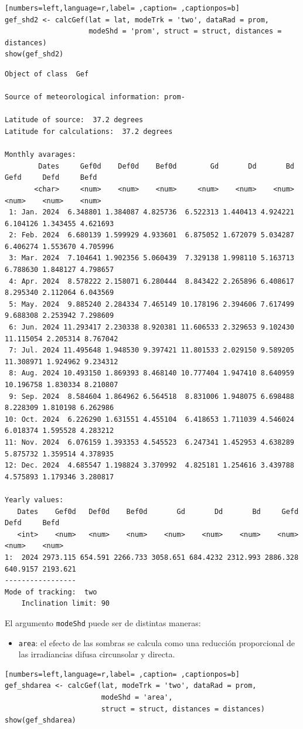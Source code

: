 \begin{lstlisting}[numbers=left,language=r,label= ,caption= ,captionpos=b]
gef_shd2 <- calcGef(lat = lat, modeTrk = 'two', dataRad = prom,
                    modeShd = 'prom', struct = struct, distances = distances)
show(gef_shd2)
\end{lstlisting}

\begin{verbatim}
Object of class  Gef 

Source of meteorological information: prom- 

Latitude of source:  37.2 degrees
Latitude for calculations:  37.2 degrees

Monthly avarages:
        Dates     Gef0d    Def0d    Bef0d        Gd       Dd       Bd      Gefd     Defd     Befd
       <char>     <num>    <num>    <num>     <num>    <num>    <num>     <num>    <num>    <num>
 1: Jan. 2024  6.348801 1.384087 4.825736  6.522313 1.440413 4.924221  6.104126 1.343455 4.621693
 2: Feb. 2024  6.680139 1.599929 4.933601  6.875052 1.672079 5.034287  6.406274 1.553670 4.705996
 3: Mar. 2024  7.104641 1.902356 5.060439  7.329138 1.998110 5.163713  6.788630 1.848127 4.798657
 4: Apr. 2024  8.578222 2.158071 6.280444  8.843422 2.265896 6.408617  8.295340 2.112064 6.043569
 5: May. 2024  9.885240 2.284334 7.465149 10.178196 2.394606 7.617499  9.688308 2.253942 7.298609
 6: Jun. 2024 11.293417 2.230338 8.920381 11.606533 2.329653 9.102430 11.115054 2.205314 8.767042
 7: Jul. 2024 11.495648 1.948530 9.397421 11.801533 2.029150 9.589205 11.308971 1.924962 9.234312
 8: Aug. 2024 10.493150 1.869393 8.468140 10.777404 1.947410 8.640959 10.196758 1.830334 8.210807
 9: Sep. 2024  8.584604 1.864962 6.564518  8.831006 1.948075 6.698488  8.228309 1.810198 6.262986
10: Oct. 2024  6.226290 1.631551 4.455104  6.418653 1.711039 4.546024  6.018374 1.595528 4.283212
11: Nov. 2024  6.076159 1.393353 4.545523  6.247341 1.452953 4.638289  5.875732 1.359514 4.378935
12: Dec. 2024  4.685547 1.198824 3.370992  4.825181 1.254616 3.439788  4.575893 1.179346 3.280817

Yearly values:
   Dates    Gef0d   Def0d    Bef0d       Gd       Dd       Bd     Gefd     Defd     Befd
   <int>    <num>   <num>    <num>    <num>    <num>    <num>    <num>    <num>    <num>
1:  2024 2973.115 654.591 2266.733 3058.651 684.4232 2312.993 2886.328 640.9157 2193.621
-----------------
Mode of tracking:  two 
    Inclination limit: 90
\end{verbatim}

El argumento \texttt{modeShd} puede ser de distintas maneras:
\begin{itemize}
\item \texttt{area}: el efecto de las sombras se calcula como una reducción proporcional de las irradiancias difusa circunsolar y directa.
\end{itemize}
\begin{lstlisting}[numbers=left,language=r,label= ,caption= ,captionpos=b]
gef_shdarea <- calcGef(lat, modeTrk = 'two', dataRad = prom,
                       modeShd = 'area',
                       struct = struct, distances = distances)
show(gef_shdarea)
\end{lstlisting}

